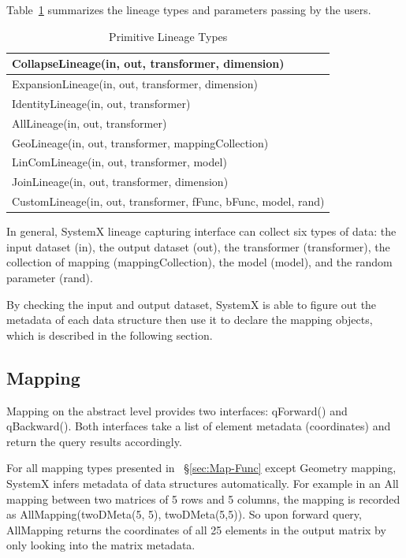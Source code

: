 \documentclass{sig-alternate}
\begin{document}
Table~\ref{tb:lineage-interface} summarizes the lineage types and parameters passing by the users.
\begin{table}[ht]
\begin{center}
    \caption{Primitive Lineage Types}
    \begin{scriptsize}
    \begin{tabular}{ | p{8cm}|}
    \hline
    CollapseLineage(in, out, transformer, dimension) \\ \hline 
    ExpansionLineage(in, out, transformer, dimension) \\ \hline
    IdentityLineage(in, out, transformer) \\ \hline
    AllLineage(in, out, transformer) \\ \hline
    GeoLineage(in, out, transformer, mappingCollection) \\ \hline
    LinComLineage(in, out, transformer, model) \\ \hline
    JoinLineage(in, out, transformer, dimension) \\ \hline
    CustomLineage(in, out, transformer, fFunc, bFunc, model, rand) \\ \hline
    \end{tabular}
    \end{scriptsize}
    \label{tb:lineage-interface}
\end{center}   
\end{table}

In general, SystemX lineage capturing interface can collect six types of data: 
the input dataset (in), the output dataset (out), the transformer (transformer), 
the collection of mapping (mappingCollection), the model (model), and the random 
parameter (rand).

By checking the input and output dataset, SystemX is able to figure out the metadata of each data structure then use
it to declare the mapping objects, which is described in the following section.

\subsection{Mapping}
\label{sec:Design-Mapping}
Mapping on the abstract level provides two interfaces: qForward() and qBackward(). Both interfaces
take a list of element metadata (coordinates) and return the query results accordingly.

For all mapping types presented in ~\S\ref{sec:Map-Func} except Geometry mapping, 
SystemX infers metadata of data structures automatically. 
For example in an All mapping between two matrices of 5 rows and 5 columns,
the mapping is recorded as AllMapping(twoDMeta(5, 5), twoDMeta(5,5)). 
So upon forward query, AllMapping returns the coordinates of all 25 elements in the output matrix by only looking into the matrix metadata.
\end{document}
